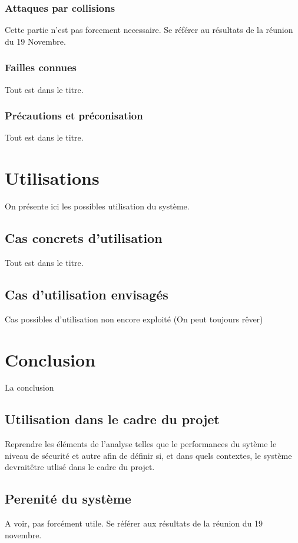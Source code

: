 \documentclass{../res/univ-projet}
\begin{document}
    \subsubsection{Attaques par collisions}
      Cette partie n'est pas forcement necessaire. Se référer au résultats de la réunion du 19 Novembre.
    
    \subsubsection{Failles connues}
      Tout est dans le titre.
    
    \subsubsection{Précautions et préconisation}
      Tout est dans le titre.
  
\section{Utilisations}
  On présente ici les possibles utilisation du système.
  \subsection{Cas concrets d'utilisation}
    Tout est dans le titre.
  
  \subsection{Cas d'utilisation envisagés}
    Cas possibles d'utilisation non encore exploité (On peut toujours r\^ever)

\section{Conclusion}
  La conclusion
  \subsection{Utilisation dans le cadre du projet}
    Reprendre les éléments de l'analyse telles que le performances du sytème le niveau de sécurité et autre afin de définir si, et dans quels contextes, le système devrait\^etre utlisé dans le cadre du projet.
  
  \subsection{Perenité du système}
    A voir, pas forcément utile. Se référer aux résultats de la réunion du 19 novembre.
    
\end{document}
